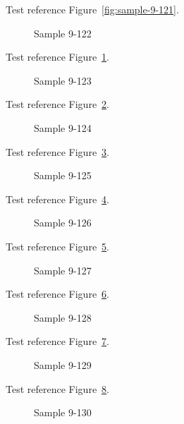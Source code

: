 Test reference Figure~\ref{fig:sample-9-121}.

\begin{figure}[tbhp]
\caption{Sample 9-122}
\label{fig:sample-9-122}
\end{figure}

Test reference Figure~\ref{fig:sample-9-122}.

\begin{figure}[tbhp]
\caption{Sample 9-123}
\label{fig:sample-9-123}
\end{figure}

Test reference Figure~\ref{fig:sample-9-123}.

\begin{figure}[tbhp]
\caption{Sample 9-124}
\label{fig:sample-9-124}
\end{figure}

Test reference Figure~\ref{fig:sample-9-124}.

\begin{figure}[tbhp]
\caption{Sample 9-125}
\label{fig:sample-9-125}
\end{figure}

Test reference Figure~\ref{fig:sample-9-125}.

\begin{figure}[tbhp]
\caption{Sample 9-126}
\label{fig:sample-9-126}
\end{figure}

Test reference Figure~\ref{fig:sample-9-126}.

\begin{figure}[tbhp]
\caption{Sample 9-127}
\label{fig:sample-9-127}
\end{figure}

Test reference Figure~\ref{fig:sample-9-127}.

\begin{figure}[tbhp]
\caption{Sample 9-128}
\label{fig:sample-9-128}
\end{figure}

Test reference Figure~\ref{fig:sample-9-128}.

\begin{figure}[tbhp]
\caption{Sample 9-129}
\label{fig:sample-9-129}
\end{figure}

Test reference Figure~\ref{fig:sample-9-129}.

\begin{figure}[tbhp]
\caption{Sample 9-130}
\label{fig:sample-9-130}
\end{figure}


